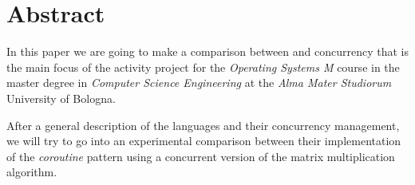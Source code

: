 \section*{Abstract}

In this paper we are going to make a comparison between \Kotlin and \Go concurrency that is the main focus of the activity project for the \textit{Operating Systems M} course in the master degree in \textit{Computer Science Engineering} at the \textit{Alma Mater Studiorum} University of Bologna.

After a general description of the languages and their concurrency management, we will try to go into an experimental comparison between their implementation of the \textit{coroutine} pattern using a concurrent version of the matrix multiplication algorithm. 
